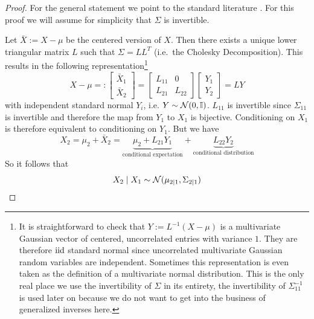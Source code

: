 \begin{proof}
    For the general statement we point to the standard literature
    \citep[e.g.][]{eatonMultivariateStatisticsVector2007}.
    For this proof we will assume for simplicity that \(\Sigma\) is invertible.

    Let \(\bar{X} := X-\mu\) be the centered version of \(X\). Then there exists
    a unique lower triangular matrix \(L\) such that \(\Sigma = LL^T\) (i.e.\ the Cholesky
    Decomposition). This results in the following representation\footnote{
        It is straightforward to check that \(Y := L^{-1}(X-\mu)\)
        is a multivariate Gaussian vector of centered, uncorrelated entries with variance \(1\).
        They are therefore \(\mathrm{iid}\) standard normal since uncorrelated multivariate Gaussian
        random variables are independent. Sometimes this representation is even
        taken as the definition of a multivariate normal distribution.
        This is the only real place we use the invertibility of \(\Sigma\) in
        its entirety, the invertibility of \(\Sigma_{11}^{-1}\) is used later on
        because we do not want to get into the business of generalized inverses
        here.
    }
    \[
        X - \mu =:
        \begin{bmatrix}
            \bar{X}_1
            \\
            \bar{X}_2
        \end{bmatrix}
        = \begin{bmatrix}
            L_{11} & 0
            \\
            L_{21} & L_{22}
        \end{bmatrix}
        \begin{bmatrix}
            Y_1 \\ Y_2
        \end{bmatrix}
        = LY
    \]
    with independent standard normal \(Y_i\), i.e. \(Y\sim\mathcal{N}(0, \mathbb{I})\).
    \(L_{11}\) is invertible since \(\Sigma_{11}\) is invertible and therefore the map from
    \(Y_1\) to \(X_1\) is bijective. Conditioning on \(X_1\) is therefore
    equivalent to conditioning on \(Y_1\). But we have
    \begin{equation}
        \label{eq: underlying explicit decomposition}
        X_2 = \mu_2 + \bar{X}_2
        = \underbrace{\mu_2 + L_{21}Y_1}_{\text{conditional expectation}} + \underbrace{L_{22} Y_2}_{\text{conditional distribution}}
    \end{equation}
    So it follows that
    \[
        X_2\mid X_1 \sim  \mathcal{N}(\mu_{2\mid 1}, \Sigma_{2\mid 1})
\]
\end{proof}
